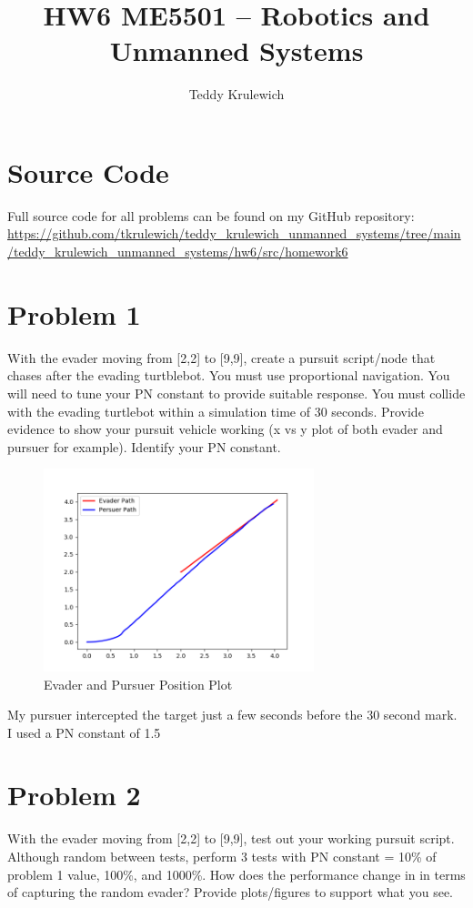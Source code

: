 \documentclass{article}
\author{Teddy Krulewich}
\title{\vspace{-4em}HW6 ME5501 – Robotics and Unmanned Systems}
\begin{document}
\maketitle

\section*{Source Code}

Full source code for all problems can be found on my GitHub repository:
\url{https://github.com/tkrulewich/teddy_krulewich_unmanned_systems/tree/main/teddy_krulewich_unmanned_systems/hw6/src/homework6}

\section*{Problem 1}

With the evader moving from [2,2] to [9,9], create a pursuit script/node that chases after the evading 
turtblebot. You must use proportional navigation. You will need to tune your PN constant to 
provide suitable response. You must collide with the evading turtlebot within a simulation time of 30 
seconds.
Provide evidence to show your pursuit vehicle working (x vs y plot of both evader and pursuer for 
example).
Identify your PN constant.

\bigskip

\begin{figure}[H]
\centering
\includegraphics[width=0.7\textwidth]{images/question1.png}
\caption{Evader and Pursuer Position Plot}
\label{fig:question1}
\end{figure}

\bigskip
\noindent My pursuer intercepted the target just a few seconds before the 30 second mark. I used a PN constant of 1.5


\section*{Problem 2}
With the evader moving from [2,2] to [9,9], test out your working pursuit script. Although random 
between tests, perform 3 tests with PN constant = 10\% of problem 1 value, 100\%, and 1000\%. 
How does the performance change in in terms of capturing the random evader? Provide 
plots/figures to support what you see.
\end{document}

